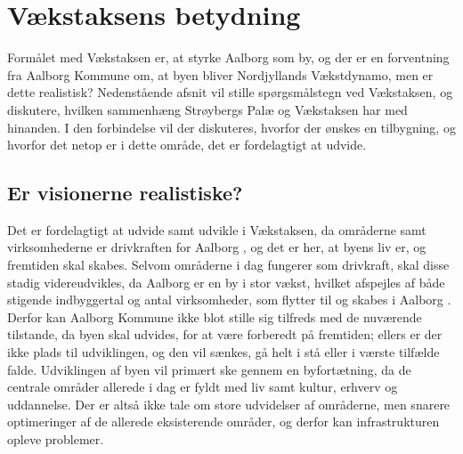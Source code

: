\section{Vækstaksens betydning}
Formålet med Vækstaksen er, at styrke Aalborg som by, og der er en forventning fra Aalborg Kommune om, at byen bliver Nordjyllands Vækstdynamo, men er dette realistisk? Nedenstående afsnit vil stille spørgsmålstegn ved Vækstaksen, og diskutere, hvilken sammenhæng Strøybergs Palæ og Vækstaksen har med hinanden. I den forbindelse vil der diskuteres, hvorfor der ønskes en tilbygning, og hvorfor det netop er i dette område, det er fordelagtigt at udvide.

\subsection{Er visionerne realistiske?}
Det er fordelagtigt at udvide samt udvikle i Vækstaksen, da områderne samt virksomhederne er drivkraften for Aalborg \citep{bedreoverblik}, og det er her, at byens liv er, og fremtiden skal skabes. Selvom områderne i dag fungerer som drivkraft, skal disse stadig videreudvikles, da Aalborg er en by i stor vækst, hvilket afspejles af både stigende indbyggertal og antal virksomheder, som flytter til og skabes i Aalborg \citep{statistik}\citep{virksomheder}. Derfor kan Aalborg Kommune ikke blot stille sig tilfreds med de nuværende tilstande, da byen skal udvides, for at være forberedt på fremtiden; ellers er der ikke plads til udviklingen, og den vil sænkes, gå helt i stå eller i værste tilfælde falde.
\newline \indent{     }  Udviklingen af byen vil primært ske gennem en byfortætning, da de centrale områder allerede i dag er fyldt med liv samt kultur, erhverv og uddannelse. Der er altså ikke tale om store udvidelser af områderne, men snarere optimeringer af de allerede eksisterende områder, og derfor kan infrastrukturen opleve problemer. 
